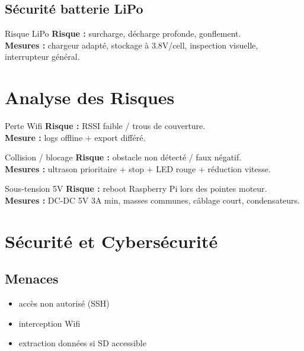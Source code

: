 \documentclass[a4paper,12pt]{report}
\begin{document}
\section{Sécurité batterie LiPo}
\begin{alertbox}{Risque LiPo}
\textbf{Risque :} surcharge, décharge profonde, gonflement.\\
\textbf{Mesures :} chargeur adapté, stockage à 3.8V/cell, inspection visuelle, interrupteur général.
\end{alertbox}

\chapter{Analyse des Risques}

\begin{alertbox}{Perte Wifi}
\textbf{Risque :} RSSI faible / trous de couverture.\\
\textbf{Mesure :} logs offline + export différé.
\end{alertbox}

\begin{alertbox}{Collision / blocage}
\textbf{Risque :} obstacle non détecté / faux négatif.\\
\textbf{Mesures :} ultrason prioritaire + stop + LED rouge + réduction vitesse.
\end{alertbox}

\begin{alertbox}{Sous-tension 5V}
\textbf{Risque :} reboot Raspberry Pi lors des pointes moteur.\\
\textbf{Mesures :} DC-DC 5V 3A min, masses communes, câblage court, condensateurs.
\end{alertbox}

\chapter{Sécurité et Cybersécurité}

\section{Menaces}
\begin{itemize}
    \item accès non autorisé (SSH)
    \item interception Wifi
    \item extraction données si SD accessible
\end{itemize}
\end{document}
